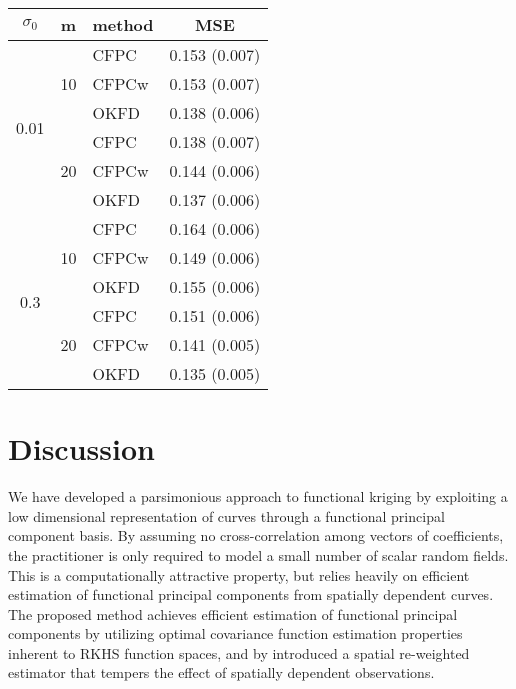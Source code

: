 \begin{table}
	\begin{center}
		\begin{tabular}{|c|c|l|c|} \hline
			$\sigma_0$ & m & method & MSE \\
			\hline
			\multirow{6}{*}{0.01}& \multirow{3}{*}{10}
			  &CFPC&  0.153  (0.007)  \\
			& &CFPCw& 0.153  (0.007)  \\
			& &OKFD& 0.138  (0.006) \\
			\cline{2-4} & \multirow{3}{*}{20}
			  &CFPC& 0.138  (0.007) \\
			& &CFPCw&  0.144  (0.006)  \\
			& &OKFD& 0.137  (0.006) \\
			\hline \multirow{6}{*}{0.3}& \multirow{3}{*}{10}
			  &CFPC& 0.164  (0.006)  \\
			& &CFPCw& 0.149  (0.006) \\
			& &OKFD& 0.155  (0.006) \\
			\cline{2-4} & \multirow{3}{*}{20}
			  &CFPC& 0.151  (0.006)  \\
			& &CFPCw& 0.141  (0.005) \\
			& &OKFD& 0.135  (0.005)  \\
			\hline
		\end{tabular}
	\label{tab:kriging_pred_2}
	\end{center}
\end{table}


\section{Discussion} %
\label{sec:discussion}
 We have developed a parsimonious approach to functional kriging by exploiting a low dimensional representation of curves through a functional principal component basis. By assuming no cross-correlation among vectors of coefficients, the practitioner is only required to model a small number of scalar random fields. This is a computationally attractive property, but relies heavily on efficient estimation of functional principal components from spatially dependent curves.  The proposed method achieves efficient estimation of functional principal components by utilizing optimal covariance function estimation properties inherent to RKHS function spaces, and by introduced a spatial re-weighted estimator that tempers the effect of spatially dependent observations. 

